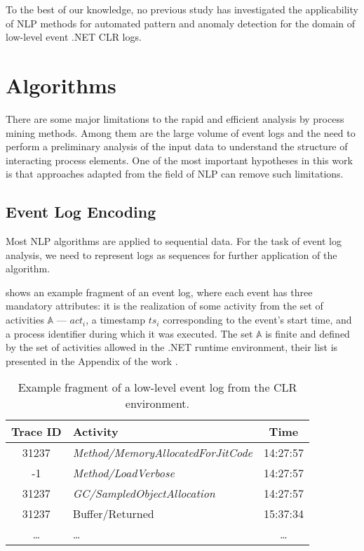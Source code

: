 \documentclass[sigplan,nonacm]{acmart}
\begin{document}
To the best of our knowledge, no previous study has investigated the applicability of NLP methods for automated pattern and anomaly detection for the domain of low-level event .NET CLR logs.

\section{Algorithms}\label{sec:algorithms}
There are some major limitations to the rapid and efficient analysis by process mining methods. Among them are the large volume of event logs and the need to perform a preliminary analysis of the input data to understand the structure of interacting process elements. One of the most important hypotheses in this work is that approaches adapted from the field of NLP can remove such limitations.

\subsection{Event Log Encoding}\label{sec:encoding}

Most NLP algorithms are applied to sequential data. For the task of event log analysis, we need to represent logs as sequences for further application of the algorithm.

 shows an example fragment of an event log, where each event has three mandatory attributes: it is the realization of some activity from the set of activities $\mathbb{A}$ — $act_i$, a timestamp $ts_i$ corresponding to the event's start time, and a process identifier during which it was executed. The set $\mathbb{A}$ is finite and defined by the set of activities allowed in the .NET runtime environment, their list is presented in the Appendix of the work \cite{stepanov2024extracting}.

\begin{table}[ht]
    \centering
    \caption{Example fragment of a low-level event log from the CLR environment.}
    \small %
    \begin{tabular}{|c|p{4.5cm}|c|}
        \hline
        Trace ID & Activity & Time \\ \hline
        31237 & \textit{Method/MemoryAllocatedForJitCode} & 14:27:57 \\ \hline
        -1 & \textit{Method/LoadVerbose} & 14:27:57 \\ \hline
        31237 & \textit{GC/SampledObjectAllocation} & 14:27:57 \\ \hline
        31237 & Buffer/Returned & 15:37:34 \\ \hline
        \ldots & \ldots & \ldots \\ \hline
    \end{tabular}
    \label{tab:event_log}
\end{table}
\end{document}

